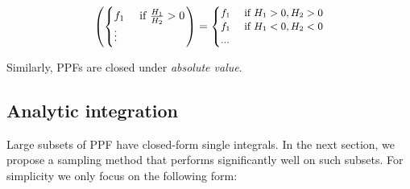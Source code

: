\documentclass[letterpaper]{article}
\newcommand{\case}[2]{#2 &\text{ if } #1}%
\begin{document}
{
\footnotesize
\begin{equation} 
\label{e:fractional2nlpa}
\left(
 \begin{cases}
  \case{\frac{H_1}{H_2} > 0}{f_1} \\
   \vdots
 \end{cases} 
\right)
 =
{\footnotesize
\begin{cases}
  \case{H_1 > 0, H_2 > 0 }{f_1} \\ 
  \case{H_1 < 0, H_2 < 0}{f_1} \\ 
  ...
 \end{cases} 
}
\end{equation}

}
Similarly, PPFs are closed under \emph{absolute value}.%


\subsection{Analytic integration}
Large subsets of PPF have closed-form single integrals. 
In the next section, we propose a sampling method that performs significantly well on such subsets. 
For simplicity we only focus on the following form:
\end{document}
